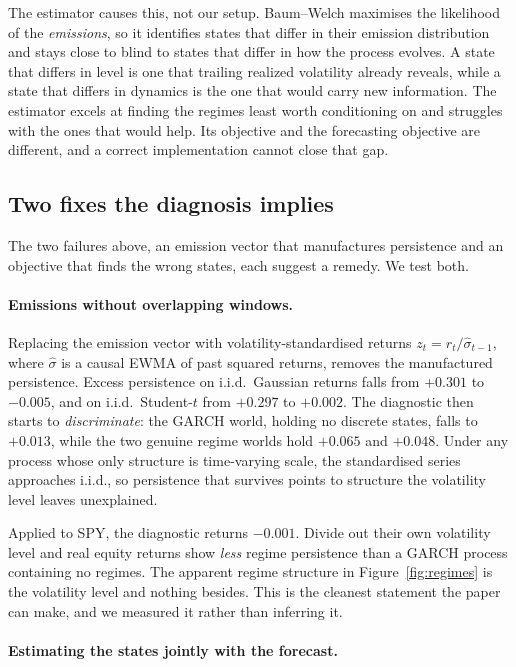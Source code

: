 \documentclass[sigconf,nonacm]{acmart}
\begin{document}
The estimator causes this, not our setup. Baum--Welch maximises the likelihood of
the \emph{emissions}, so it identifies states that differ in their emission
distribution and stays close to blind to states that differ in how the process
evolves. A state that differs in level is one that trailing realized volatility
already reveals, while a state that differs in dynamics is the one that would
carry new information. The estimator excels at finding the regimes least worth
conditioning on and struggles with the ones that would help. Its objective and
the forecasting objective are different, and a correct implementation cannot
close that gap.

\subsection{Two fixes the diagnosis implies}
\label{sec:fixes}

The two failures above, an emission vector that manufactures persistence and an
objective that finds the wrong states, each suggest a remedy. We test both.

\paragraph{Emissions without overlapping windows.}
Replacing the emission vector with volatility-standardised returns
$z_t = r_t / \hat\sigma_{t-1}$, where $\hat\sigma$ is a causal EWMA of past
squared returns, removes the manufactured persistence. Excess persistence on
i.i.d.\ Gaussian returns falls from $+0.301$ to $-0.005$, and on i.i.d.\
Student-$t$ from $+0.297$ to $+0.002$. The diagnostic then starts to
\emph{discriminate}: the GARCH world, holding no discrete states, falls to
$+0.013$, while the two genuine regime worlds hold $+0.065$ and $+0.048$. Under
any process whose only structure is time-varying scale, the standardised series
approaches i.i.d., so persistence that survives points to structure the
volatility level leaves unexplained.

Applied to SPY, the diagnostic returns $-0.001$. Divide out their own volatility
level and real equity returns show \emph{less} regime persistence than a GARCH
process containing no regimes. The apparent regime structure in
Figure~\ref{fig:regimes} is the volatility level and nothing besides. This is the
cleanest statement the paper can make, and we measured it rather than inferring
it.

\paragraph{Estimating the states jointly with the forecast.}
\end{document}
